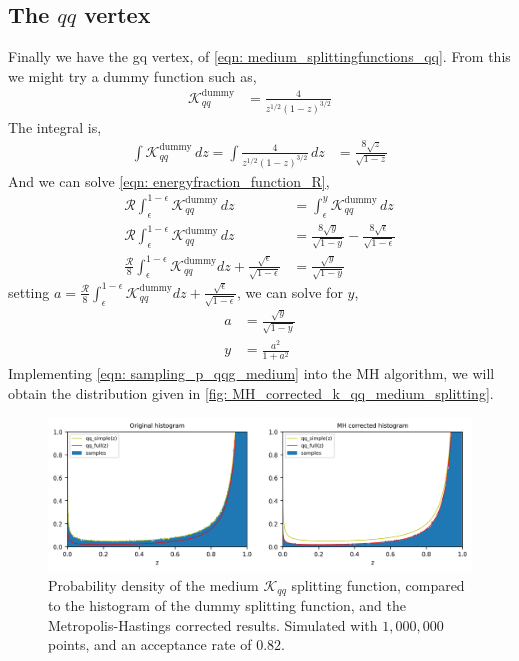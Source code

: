 \documentclass[main.tex]{subfiles}
\begin{document}
\subsection*{The \(qq\) vertex}
Finally we have the gq vertex, of \autoref{eqn: medium_splittingfunctions_qq}. From this we might try a dummy function such as, 
\begin{align}
    \mathcal{K}_{qq}^{\text{dummy}} &= \frac{4}{z^{1/2} (1-z)^{3/2}}
\end{align}
The integral is, 
\begin{align}
    \int \mathcal{K}_{qq}^{\text{dummy}} \,dz = \int \frac{4}{z^{1/2}(1-z)^{3/2}} \,dz &= \frac{8 \sqrt{z}}{\sqrt{1-z}}
\end{align}
And we can solve \autoref{eqn: energyfraction_function_R}, 
\begin{align}
    \mathcal{R}\int_\epsilon^{1-\epsilon} \mathcal{K}_{qq}^{\text{dummy}} \,dz  &= \int_\epsilon^{y} \mathcal{K}_{qq}^{\text{dummy}} \,dz  \nonumber\\
    \mathcal{R}\int_\epsilon^{1-\epsilon} \mathcal{K}_{qq}^{\text{dummy}} \,dz  &= \frac{8\sqrt{y}}{\sqrt{1-y}} - \frac{8\sqrt{\epsilon}}{\sqrt{1-\epsilon}} \nonumber\\
    \frac{\mathcal{R}}{8} \int_\epsilon^{1-\epsilon} \mathcal{K}_{qq}^{\text{dummy}} dz + \frac{\sqrt{\epsilon}}{\sqrt{1-\epsilon}} &= \frac{\sqrt{y}}{\sqrt{1-y}}
\end{align}
setting \(a = \frac{\mathcal{R}}{8} \int_\epsilon^{1-\epsilon} \mathcal{K}_{qq}^{\text{dummy}} dz + \frac{\sqrt{\epsilon}}{\sqrt{1-\epsilon}}\), we can solve for \(y\),
\begin{align} \label{eqn: sampling_p_qqg_medium}
    a &= \frac{\sqrt{y}}{\sqrt{1-y}} \nonumber\\
    y &= \frac{a^2}{1 + a^2} 
\end{align}
Implementing \autoref{eqn: sampling_p_qqg_medium} into the MH algorithm, we will obtain the distribution given in \autoref{fig: MH_corrected_k_qq_medium_splitting}.
\begin{figure}[t]
    \centering
    \includegraphics[width=15cm]{pictures/plots/Metropolis-Hastings/MH_medium_qq.png}
    \caption{Probability density of the medium \(\mathcal{K}_{qq}\) splitting function, compared to the histogram of the dummy splitting function, and the Metropolis-Hastings corrected results. Simulated with \(1,000,000\) points, and an acceptance rate of \(0.82\).}
    \label{fig: MH_corrected_k_qq_medium_splitting}
\end{figure}
\end{document}
